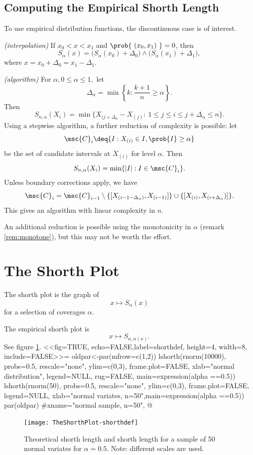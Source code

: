 \documentclass[dvips,12pt,a4paper,twoside]{amsart}
\begin{document}
%
%
\subsection{Computing the Empirical Shorth Length}
To use empirical distribution functions, the discontinuous case is of interest.

\begin{rem}\emph{(interpolation)}\label{rem:interpolation}
If $x_0 < x < x_1$ and $\prob{\ \left( x_0, x_1 \right)\  }=0$, then 
$$S_{\alpha}(x) = \big(S_{\alpha}\left(x_0\right) + \Delta_0\big) \wedge 
\big(S_{\alpha}\left(x_1\right) + \Delta_1\big),$$
where $x= x_0 + \Delta_0 = x_1 - \Delta_1$.
\end{rem}
%
\begin{rem}\emph{(algorithm)}\label{rem:algo}
For $\alpha, 0 \leq \alpha \leq 1,$ let 
$$\Delta_{\alpha} = \min\left\{k: \frac{k+1}{n} \geq \alpha\right\}.$$
Then
$$
S_{n,\alpha}(X_{i})= \min \{X_{(j+\Delta_{\alpha}} - X_{(j)} : \ 1 \leq j \leq i \leq j+\Delta_{\alpha} \leq n\}.
$$
Using a stepwise algorithm, a further reduction of complexity is possible: 
let 
$$\msc{C}_i \deq \{ I : X_{(i)} \in I, \prob{I} \geq	 \alpha\}$$
be the set of candidate intervals at $X_{(i)}$ for level $\alpha$. 
Then
$$S_{n,\alpha}(X_{i}) = \min\{|I|: I \in \msc{C}_i \}.$$
Unless boundary corrections apply, we have
$$\msc{C}_i = \msc{C}_{i-1} \setminus \{ [X_{(i-1-\Delta_{\alpha})}, X_{(i-1)}] \} 
\cup \{ [X_{(i)}, X_{(i+\Delta_{\alpha}})] \}.$$ 
This gives an algorithm with linear complexity in $n$.

\end{rem}

An additional reduction is possible using the monotonicity in $\alpha$ (remark \ref{rem:monotone}), but this may not be worth the effort.
%
%
%
\section{The Shorth Plot}
\begin{dfn}
The shorth plot is the graph of 
$$x \mapsto S_\alpha(x)$$
 for a selection of coverages $\alpha$.
\end{dfn}

The empirical shorth plot is $$x \mapsto S_{n,\alpha(x)}.$$ See figure \ref{fig:shorthdef}.
<<fig=TRUE, echo=FALSE,label=shorthdef, height=4, width=8, include=FALSE>>=
oldpar<-par(mfrow=c(1,2))
lshorth(rnorm(10000), probs=0.5,  rescale="none", ylim=c(0,3), frame.plot=FALSE, xlab="normal distribution", legend=NULL, rug=FALSE, main=expression(alpha ==0.5))
lshorth(rnorm(50), probs=0.5,  rescale="none", ylim=c(0,3), frame.plot=FALSE, legend=NULL, xlab="normal variates, n=50",main=expression(alpha ==0.5))
par(oldpar)
#xname="normal sample, n=50",
@
\begin{figure}[htb]
\texttt{[image: TheShorthPlot-shorthdef]}
\caption{Theoretical shorth length and shorth length for a sample of 50 normal variates for $\alpha=0.5$. Note: different scales are used.}
\label{fig:shorthdef}
\end{figure}
\end{document}
